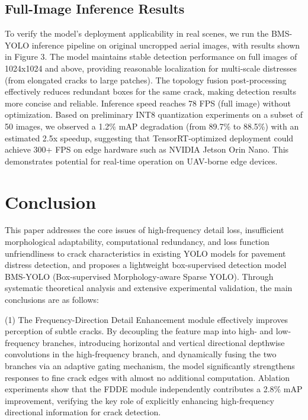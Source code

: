 \documentclass[twocolumn]{sn-jnl}
\begin{document}
	\subsection{Full-Image Inference Results}
	To verify the model's deployment applicability in real scenes, we run the BMS-YOLO inference pipeline on original uncropped aerial images, with results shown in Figure 3. The model maintains stable detection performance on full images of 1024x1024 and above, providing reasonable localization for multi-scale distresses (from elongated cracks to large patches). The topology fusion post-processing effectively reduces redundant boxes for the same crack, making detection results more concise and reliable. Inference speed reaches 78 FPS (full image) without optimization. Based on preliminary INT8 quantization experiments on a subset of 50 images, we observed a 1.2\% mAP degradation (from 89.7\% to 88.5\%) with an estimated 2.5x speedup, suggesting that TensorRT-optimized deployment could achieve 300+ FPS on edge hardware such as NVIDIA Jetson Orin Nano. This demonstrates potential for real-time operation on UAV-borne edge devices.
	
	\section{Conclusion}
	This paper addresses the core issues of high-frequency detail loss, insufficient morphological adaptability, computational redundancy, and loss function unfriendliness to crack characteristics in existing YOLO models for pavement distress detection, and proposes a lightweight box-supervised detection model BMS-YOLO (Box-supervised Morphology-aware Sparse YOLO). Through systematic theoretical analysis and extensive experimental validation, the main conclusions are as follows:
	
	(1) The Frequency-Direction Detail Enhancement module effectively improves perception of subtle cracks. By decoupling the feature map into high- and low-frequency branches, introducing horizontal and vertical directional depthwise convolutions in the high-frequency branch, and dynamically fusing the two branches via an adaptive gating mechanism, the model significantly strengthens responses to fine crack edges with almost no additional computation. Ablation experiments show that the FDDE module independently contributes a 2.8\% mAP improvement, verifying the key role of explicitly enhancing high-frequency directional information for crack detection.
	
\end{document}
